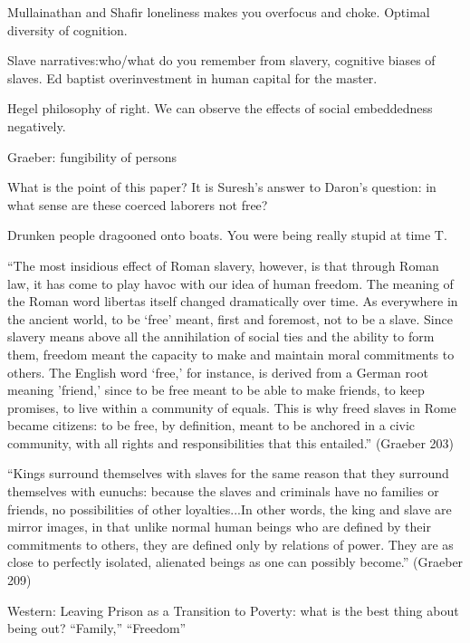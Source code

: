 \documentclass[10pt,a4paper]{article}
\begin{document}
 Mullainathan and Shafir loneliness makes you overfocus and choke. Optimal diversity of cognition.
 
 
 Slave narratives:who/what do you remember from slavery, cognitive biases of slaves. Ed baptist overinvestment in human capital for the master.
 
 Hegel philosophy of right.
 We can observe the effects of social embeddedness negatively. 
 
 Graeber: fungibility of persons
 
 What is the point of this paper? It is Suresh's answer to Daron's question: 
 in what sense are these coerced laborers not free?
 
 Drunken people dragooned onto boats. You were being really stupid at time T. 
 
 ``The most insidious effect of Roman slavery, however, is that through Roman law, 
 it has come to play havoc with our idea of human freedom. The meaning of the Roman 
 word libertas itself changed dramatically over time. As everywhere in the ancient world, 
 to be `free' meant, first and foremost, not to be a slave. Since slavery means above all 
 the annihilation of social ties and the ability to form them, freedom meant the capacity 
 to make and maintain moral commitments to others. The English word `free,' for instance, 
 is derived from a German root meaning 'friend,' since to be free meant to be able to 
 make friends, to keep promises, to live within a community of equals. This is why freed 
 slaves in Rome became citizens: to be free, by definition, meant to be anchored in a 
 civic community, with all rights and responsibilities that this entailed.'' (Graeber 203)
 
 ``Kings surround themselves with slaves for the same reason that they surround 
 themselves with eunuchs: because the slaves and criminals have no families or friends, 
 no possibilities of other loyalties...In other words, the king and slave are mirror images, 
 in that unlike normal human beings who are defined by their commitments to others, they are 
 defined only by relations of power. They are as close to perfectly isolated, alienated 
 beings as one can possibly become.'' (Graeber 209)
 
 Western: Leaving Prison as a Transition to Poverty: what is the best thing about being out?
 ``Family,'' ``Freedom''
 
\end{document}
